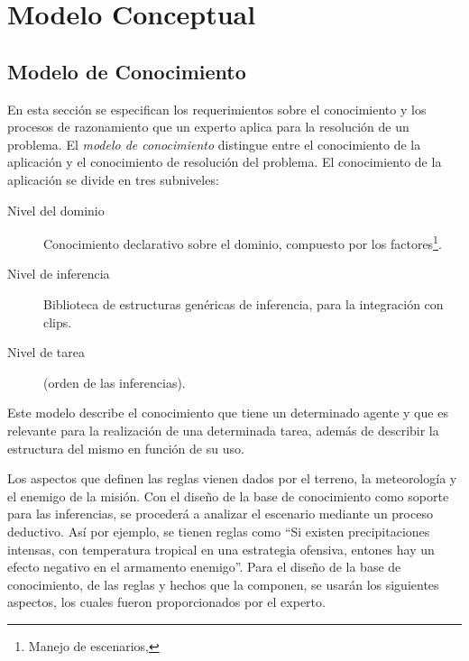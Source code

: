 \chapter{Modelo Conceptual}



\section{Modelo de Conocimiento}

En esta sección se especifican los requerimientos sobre el conocimiento y los procesos de razonamiento que un experto aplica para la resolución de un problema. El \emph{modelo de conocimiento} distingue entre el conocimiento de la aplicación y el conocimiento de resolución del problema. El conocimiento de la aplicación se divide en tres subniveles:

\begin{description}
\item[Nivel del dominio] Conocimiento declarativo sobre el dominio, compuesto por los factores\footnote{Manejo de escenarios, }.
\item[Nivel de inferencia] Biblioteca de estructuras genéricas de inferencia, para la integración con \gls{clips}.
\item[Nivel de tarea] (orden de las inferencias).
\end{description}

Este modelo describe el conocimiento que tiene un determinado agente y que es relevante para la realización de una determinada tarea, además de describir la estructura del mismo en función de su uso. 

Los aspectos que definen las reglas vienen dados por el terreno, la meteorología y el enemigo de la misión. Con el diseño de la base de conocimiento como soporte para las inferencias, se procederá a analizar el escenario mediante un proceso deductivo.
Así por ejemplo, se tienen reglas como “Si existen precipitaciones intensas, con temperatura tropical en una estrategia ofensiva, entones hay un efecto negativo en el armamento enemigo”.
Para el diseño de la base de conocimiento, de las reglas y hechos que la componen, se usarán los siguientes aspectos, los cuales fueron proporcionados por el experto.
